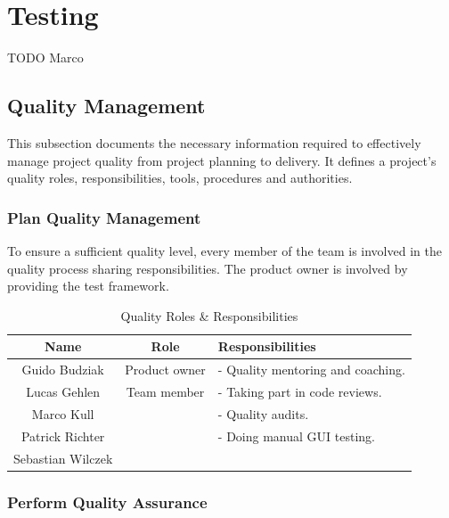 \section{Testing}
\label{sec:testing}

TODO Marco

\subsection{Quality Management}
\label{ssec:quality_management}

This subsection documents the necessary information required to effectively manage project quality from project planning to delivery. It defines a project’s quality roles, responsibilities, tools, procedures and authorities.

\subsubsection{Plan Quality Management}
\label{ssec:plan_quality}

To ensure a sufficient quality level, every member of the team is involved in the quality process sharing responsibilities. The product owner is involved by providing the test framework.

\begin{table}[H]
    \centering
    \begin{tabular}{|c|c|l|}
        \hline
        \cellcolor{gray}Name & 
        \cellcolor{gray}Role &
        \cellcolor{gray}Responsibilities \\ \hline
        Guido Budziak & Product owner & - Quality mentoring and coaching.\\ \hline
        Lucas Gehlen&Team member&- Taking part in code reviews.\\
        Marco Kull&&- Quality audits.\\
        Patrick Richter&&- Doing manual GUI testing.\\
        Sebastian Wilczek && \\ \hline
    \end{tabular}
    \caption{Quality Roles \& Responsibilities}
    \label{tab:quality_roles}
\end{table}

\subsubsection{Perform Quality Assurance}
\label{ssec:perform_quality}

